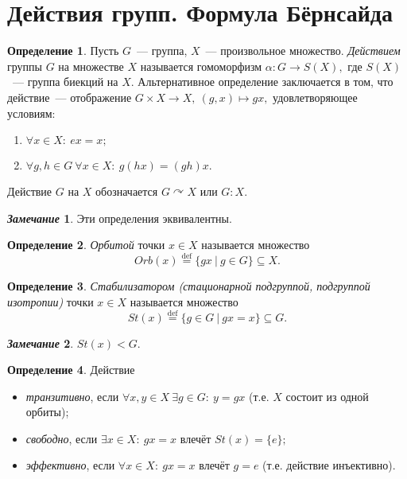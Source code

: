 \documentclass[a4paper, 14pt]{extarticle}
\newcommand{\deq}{\stackrel{\mathrm{def}}{=}}
\newcommand{\suchthat}{{:}{ } \ }
\theoremstyle{definition}
\newtheorem*{remark}{\textit{Замечание}}
\newtheorem{definition}{Определение}
\theoremstyle{plain}
\numberwithin{theorem}{section}
\numberwithin{definition}{section}
\numberwithin{statement}{section}
\numberwithin{lemma}{section}
\numberwithin{consequence}{section}
\begin{document}
        \section{Действия групп. Формула Бёрнсайда}
        \setcounter{definition}{0}
        \begin{definition}
            Пусть $G$~--- группа, $X$~--- произвольное множество. \textit{Действием} группы $G$ на множестве $X$ называется гомоморфизм ${\alpha : G \rightarrow S(X),}$ где $S(X)$~--- группа биекций на $X$. Альтернативное определение заключается в том, что действие~--- отображение ${G \times X \rightarrow X, \ (g,x) \mapsto gx,}$ удовлетворяющее условиям:
            \begin{enumerate}
                \setlength\itemsep{0.1em}
                \item $\forall x \in X\suchthat  ex = x;$
                \item $\forall g,h \in G \ \forall x \in X\suchthat g(hx) = (gh)x.$
            \end{enumerate}
            Действие $G$ на $X$ обозначается $G \curvearrowright X$ или $G : X$.
        \end{definition}
        \begin{remark}
            Эти определения эквивалентны.
        \end{remark}
        \begin{definition}
            \textit{Орбитой} точки ${x \in X}$ называется множество
            \begin{equation*}
                Orb(x) \deq \{gx \ | \ g \in G\} \subseteq X.
            \end{equation*}
        \end{definition}
        \begin{definition}
            \textit{Стабилизатором (стационарной подгруппой, подгруппой изотропии)} точки ${x \in X}$ называется множество
            \begin{equation*}
                St(x) \deq \{g \in G \ | \ gx = x\} \subseteq G.
            \end{equation*}
        \end{definition}
        \begin{remark}
            $St(x) < G.$
        \end{remark}
        \begin{definition}
            Действие
            \begin{itemize}
                \setlength\itemsep{0.1em}
                \item \textit{транзитивно}, если $\forall x,y \in X \ \exists g \in G\suchthat y = gx$ (т.е. $X$ состоит из одной орбиты);
                \item \textit{свободно}, если $\exists x \in X\suchthat gx = x$ влечёт $St(x) = \{e\};$
                \item \textit{эффективно}, если ${\forall x \in X\suchthat gx = x}$ влечёт ${g = e}$ (т.е. действие инъективно).
            \end{itemize}
        \end{definition}
\end{document}

